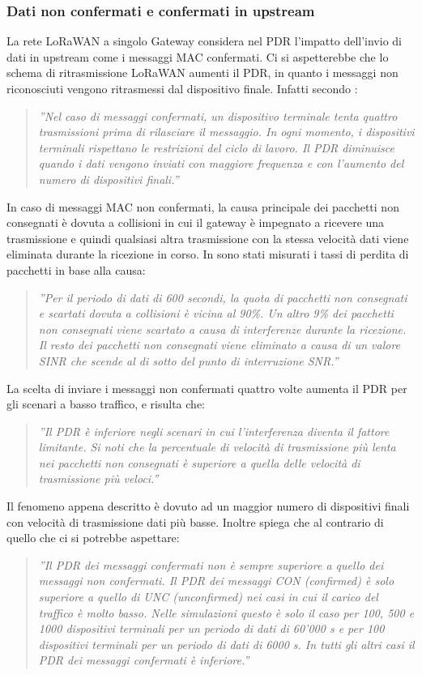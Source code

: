 \documentclass[a4paper]{report} %
\begin{document}
\subsubsection{Dati non confermati e confermati in upstream}
La rete LoRaWAN a singolo Gateway considera nel PDR l'impatto dell'invio di dati in upstream come i messaggi MAC confermati. Ci si aspetterebbe che lo schema di ritrasmissione LoRaWAN aumenti il PDR, in quanto i messaggi non riconosciuti vengono ritrasmessi dal dispositivo finale. Infatti secondo \cite{art:rif.49}:
\begin{quote}
	\textit{''Nel caso di messaggi confermati, un dispositivo terminale tenta quattro trasmissioni prima di rilasciare il messaggio. In ogni momento, i dispositivi terminali rispettano le restrizioni del ciclo di lavoro. Il PDR diminuisce quando i dati vengono inviati con maggiore frequenza e con l'aumento del numero di dispositivi finali.''}
\end{quote}
In caso di messaggi MAC non confermati, la causa principale dei pacchetti non consegnati è dovuta a collisioni in cui il gateway è impegnato a ricevere una trasmissione e quindi qualsiasi altra trasmissione con la stessa velocità dati viene eliminata durante la ricezione in corso. In \cite{art:rif.49} sono stati misurati i tassi di perdita di pacchetti in base alla causa:
\begin{quote}
	\textit{''Per il periodo di dati di 600 secondi, la quota di pacchetti non consegnati e scartati dovuta a collisioni è vicina al 90\%. Un altro 9\% dei pacchetti non consegnati viene scartato a causa di interferenze durante la ricezione. Il resto dei pacchetti non consegnati viene eliminato a causa di un valore SINR che scende al di sotto del punto di interruzione SNR.''} 
\end{quote}	
La scelta di inviare i messaggi non confermati quattro volte aumenta il PDR per gli scenari a basso traffico, e risulta che:
\begin{quote}
	\textit{''Il PDR è inferiore negli scenari in cui l'interferenza diventa il fattore limitante. Si noti che la percentuale di velocità di trasmissione più lenta nei pacchetti non consegnati è superiore a quella delle velocità di trasmissione più veloci.''} 
\end{quote}	
Il fenomeno appena descritto è dovuto ad un maggior numero di dispositivi finali con velocità di trasmissione dati più basse. Inoltre \cite{art:rif.49} spiega che al contrario di quello che ci si potrebbe aspettare:
\begin{quote}
	\textit{''Il PDR dei messaggi confermati non è sempre superiore a quello dei messaggi non confermati. Il PDR dei messaggi CON (confirmed) è solo superiore a quello di UNC (unconfirmed) nei casi in cui il carico del traffico è molto basso. Nelle simulazioni questo è solo il caso per 100, 500 e 1000 dispositivi terminali per un periodo di dati di 60'000 s e per 100 dispositivi terminali per un periodo di dati di 6000 s. In tutti gli altri casi il PDR dei messaggi confermati è inferiore.''}
\end{quote}	
\end{document}
